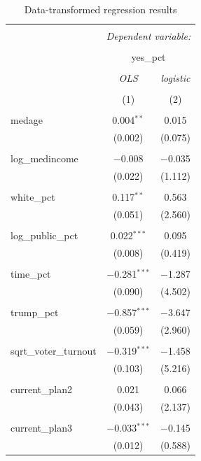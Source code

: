 \documentclass[
]{article}
\begin{document}
\begin{table}[!htbp] \centering 
  \caption{Data-transformed regression results} 
  \label{transformedResults} 
\begin{tabular}{@{\extracolsep{5pt}}lcc} 
\\[-1.8ex]\hline 
\hline \\[-1.8ex] 
 & \multicolumn{2}{c}{\textit{Dependent variable:}} \\ 
\cline{2-3} 
\\[-1.8ex] & \multicolumn{2}{c}{yes\_pct} \\ 
\\[-1.8ex] & \textit{OLS} & \textit{logistic} \\ 
\\[-1.8ex] & (1) & (2)\\ 
\hline \\[-1.8ex] 
 medage & 0.004$^{**}$ & 0.015 \\ 
  & (0.002) & (0.075) \\ 
  & & \\ 
 log\_medincome & $-$0.008 & $-$0.035 \\ 
  & (0.022) & (1.112) \\ 
  & & \\ 
 white\_pct & 0.117$^{**}$ & 0.563 \\ 
  & (0.051) & (2.560) \\ 
  & & \\ 
 log\_public\_pct & 0.022$^{***}$ & 0.095 \\ 
  & (0.008) & (0.419) \\ 
  & & \\ 
 time\_pct & $-$0.281$^{***}$ & $-$1.287 \\ 
  & (0.090) & (4.502) \\ 
  & & \\ 
 trump\_pct & $-$0.857$^{***}$ & $-$3.647 \\ 
  & (0.059) & (2.960) \\ 
  & & \\ 
 sqrt\_voter\_turnout & $-$0.319$^{***}$ & $-$1.458 \\ 
  & (0.103) & (5.216) \\ 
  & & \\ 
 current\_plan2 & 0.021 & 0.066 \\ 
  & (0.043) & (2.137) \\ 
  & & \\ 
 current\_plan3 & $-$0.033$^{***}$ & $-$0.145 \\ 
  & (0.012) & (0.588) \\ 

\end{tabular}
\end{table}
\end{document}
